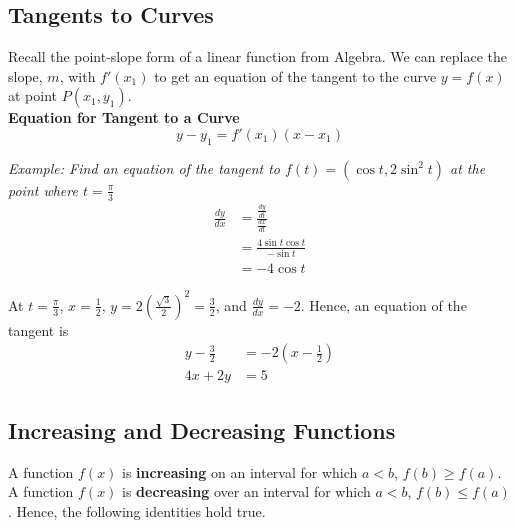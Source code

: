 \documentclass{article}
\begin{document}
        \subsection{Tangents to Curves}
            Recall the point-slope form of a linear function from Algebra. We can replace the slope,
            $m$, with $f'(x_1)$ to get an equation of the tangent to the curve $y=f(x)$ at point
            $P(x_1,y_1)$. \\

            \noindent \color{purple} \textbf{Equation for Tangent to a Curve} \color{black} \\

            \begin{equation*}
                y - y_1 = f'(x_1)(x-x_1)
            \end{equation*}

            \noindent \color{blue} \textit{Example: Find an equation of the tangent to
            $f(t)=(\cos{t}, 2\sin^2{t})$ at the point where $t=\frac{\pi}{3}$} \color{black} \\

            \begin{align*}
                \frac{dy}{dx} &= \frac{\frac{dy}{dt}}{\frac{dx}{dt}} \\
                &= \frac{4\sin{t}{\cos{t}}}{-\sin{t}} \\
                &= -4\cos{t}
            \end{align*}

            \noindent At $t=\frac{\pi}{3}$, $x=\frac{1}{2}$,
            $y=2\left(\frac{\sqrt{3}}{2}\right)^2=\frac{3}{2}$, and $\frac{dy}{dx}=-2$.
            Hence, an equation of the tangent is \\

            \begin{align*}
                y - \frac{3}{2} &= -2\left(x-\frac{1}{2}\right) \\
                4x + 2y &= 5
            \end{align*}


        \subsection{Increasing and Decreasing Functions}
            A function $f(x)$ is \textbf{increasing} on an interval for which $a<b$, $f(b)\geq f(a)$.
            A function $f(x)$ is \textbf{decreasing} over an interval for which $a<b$, $f(b)\leq f(a)$.
            Hence, the following identities hold true. \\
\end{document}
